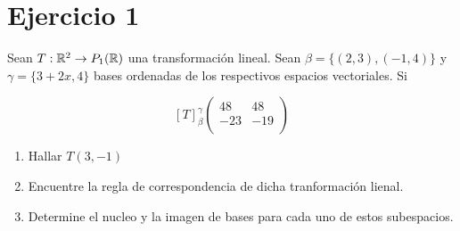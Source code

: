 \section*{Ejercicio 1}

Sean $T : \mathbb{R}^{2} \rightarrow P_{1}(\mathbb{R})$ una transformación lineal. Sean $\beta = \{ (2,3), (-1,4) \}$ y $\gamma = \{ 3 + 2x, 4\}$
bases ordenadas de los respectivos espacios vectoriales. Si

\begin{equation}
    \left[ T \right]_{\beta}^{\gamma}
     \begin{pmatrix}
        48 & 48 \\
       -23 & -19 \\
      \end{pmatrix}      
\end{equation}

\begin{enumerate}
    \item Hallar $T(3,-1)$
    \item Encuentre la regla de correspondencia de dicha tranformación lienal. 
    \item Determine el nucleo y la imagen de bases para cada uno de estos subespacios.
\end{enumerate}